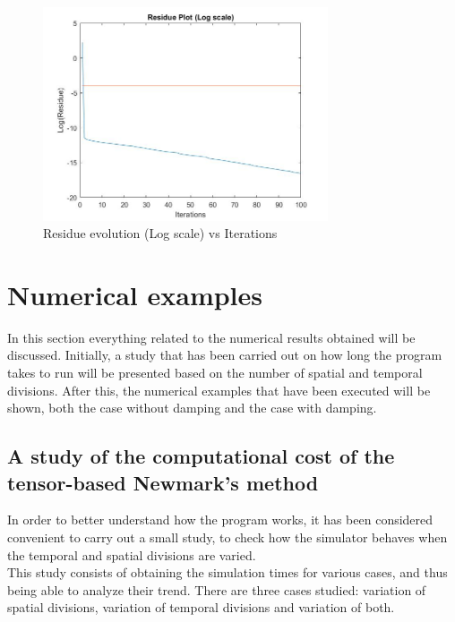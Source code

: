 \documentclass[a4paper, 10pt]{article}
\begin{document}
\begin{figure}
\centering
\includegraphics[width=0.75\textwidth]{ResIterLog}
\caption{Residue evolution (Log scale) vs Iterations } 
\label{ResIterLog}
\end{figure}


\section{Numerical examples}

In this section everything related to the numerical results obtained will be discussed. Initially, a study that has been carried out on how long the program takes to run will be presented based on the number of spatial and temporal divisions. After this, the numerical examples that have been executed will be shown, both the case without damping and the case with damping.

\subsection{A study of the computational cost of the tensor-based Newmark's method}

In order to better understand how the program works, it has been considered convenient to carry out a small study, to check how the simulator behaves when the temporal and spatial divisions are varied.\\

This study consists of obtaining the simulation times for various cases, and thus being able to analyze their trend. There are three cases studied: variation of spatial divisions, variation of temporal divisions and variation of both.\\
\end{document}
